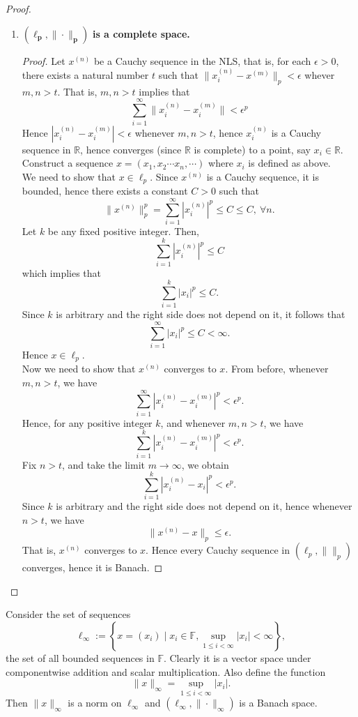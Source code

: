 \begin{eg}
\begin{proof}
\begin{enumerate}
            \item $\bm{(\ell_{p},\|\cdot\|_{p})}$\textbf{ is a complete space.}
                \begin{proof}
                    Let $x^{(n)}$ be a Cauchy sequence in the NLS, that is, for each $\epsilon>0$, there exists a natural number $t$ such that $\|x_{i}^{(n)}-x^{(m)}\|_{p}<\epsilon$ whever $m,n>t$. That is, $m,n>t$ implies that $$\sum_{i=1}^{\infty}\|x_{i}^{(n)}-x_{i}^{(m)}\|<\epsilon^{p}$$ 
                Hence $\left|x_{i}^{(n)}-x_{i}^{(m)}\right|<\epsilon$ whenever $m,n>t$, hence $x_{i}^{(n)}$ is a Cauchy sequence in $\mathbb{R}$, hence converges (since $\mathbb{R}$ is complete) to a point, say $x_{i}\in \mathbb{R}$.\\ 
                Construct a sequence $x=(x_{1},x_{2}\cdots x_{n},\cdots)$ where $x_{i}$ is defined as above.\\
                We need to show that $x\in\ell_{p}$. Since $x^{(n)}$ is a Cauchy sequence, it is bounded, hence there exists a constant $C>0$ such that $$\|x^{(n)}\|_{p}^{p}=\sum_{i=1}^{\infty}\left|x_{i}^{(n)}\right|^{p}\leq C\leq C,~\forall n.$$
                Let $k$ be any fixed positive integer. Then, $$\sum_{i=1}^{k}\left|x_{i}^{(n)}\right|^{p}\leq C$$ which implies that $$\sum_{i=1}^{k}\left|x_{i}\right|^{p}\leq C.$$
                Since $k$ is arbitrary and the right side does not depend on it, it follows that $$\sum_{i=1}^{\infty}\left|x_{i}\right|^{p}\leq C<\infty.$$
                Hence $x\in\ell_{p}$.\\ 
                Now we need to show that $x^{(n)}$ converges to $x$. From before, whenever $m,n>t$, we have $$\sum_{i=1}^{\infty}|x_{i}^{(n)}-x_{i}^{(m)}|^{p}<\epsilon^{p}.$$
                Hence, for any positive integer $k$, and whenever $m,n>t$, we have $$\sum_{i=1}^{k}|x_{i}^{(n)}-x_{i}^{(m)}|^{p}<\epsilon^{p}.$$
                Fix $n>t$, and take the limit $m\to\infty$, we obtain $$\sum_{i=1}^{k}|x_{i}^{(n)}-x_{i}|^{p}<\epsilon^{p}.$$
                Since $k$ is arbitrary and the right side does not depend on it, hence whenever $n>t$, we have $$\|x^{(n)}-x\|_{p}\leq \epsilon.$$
                That is, $x^{(n)}$ converges to $x$.
                Hence every Cauchy sequence in $(\ell_{p},\|\|_{p})$ converges, hence it is Banach.
                \end{proof}
        \end{enumerate}
        \phantom\qedhere
    \end{proof}
\end{eg}
\vspace{0.4cm}
\begin{eg}
    Consider the set of sequences $$\ell_{\infty}:=\left\{x=(x_{i})\mid x_{i}\in \mathbb{F}, \sup_{1\leq i<\infty}|x_{i}|<\infty\right\},$$ the set of all bounded sequences in $\mathbb{F}$. Clearly it is a vector space under componentwise addition and scalar multiplication. Also define the function $$\|x\|_{\infty}=\sup_{1\leq i<\infty}|x_{i}|.$$ Then $\|x\|_{\infty}$ is a norm on $\ell_{\infty}$ and $(\ell_{\infty},\|\cdot\|_{\infty})$ is a Banach space.
\end{eg}
\vspace{0.4cm}

